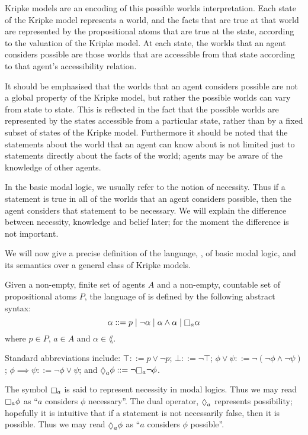 Kripke models are an encoding of this possible worlds interpretation. Each state
of the Kripke model represents a world, and the facts that are true at that
world are represented by the propositional atoms that are true at the state,
according to the valuation of the Kripke model. At each state, the worlds that
an agent considers possible are those worlds that are accessible from that state
according to that agent's accessibility relation.

It should be emphasised that the worlds that an agent considers possible are not
a global property of the Kripke model, but rather the possible worlds can vary
from state to state. This is reflected in the fact that the possible worlds are
represented by the states accessible from a particular state, rather than by a
fixed subset of states of the Kripke model. Furthermore it should be noted that
the statements about the world that an agent can know about is not limited just
to statements directly about the facts of the world; agents may be aware of the
knowledge of other agents.

In the basic modal logic, we usually refer to the notion of necessity. Thus if a
statement is true in all of the worlds that an agent considers possible, then
the agent considers that statement to be necessary. We will explain the
difference between necessity, knowledge and belief later; for the moment the
difference is not important.

We will now give a precise definition of the language, \lang{}, of basic modal
logic, and its semantics over a general class of Kripke models.

\begin{definition}
Given a non-empty, finite set of agents $A$ and a non-empty, countable set of
propositional atoms $P$, the language of \lang{} is defined by the following
abstract syntax:
$$
\alpha ::=  p \bnfalt
            \neg \alpha \bnfalt
            \alpha \land \alpha \bnfalt
            \knows_a \alpha
$$
where $p \in P$, $a \in A$ and $\alpha \in \lang{}$.
\end{definition}

Standard abbreviations include:
$\top ::= p \lor \neg p$;
$\bot ::= \neg \top$;
$\phi \lor \psi ::= \neg (\neg \phi \land \neg \psi)$;
$\phi \implies \psi ::= \neg \phi \lor \psi$;
and $\suspects_a \phi ::= \neg \knows_a \neg \phi$.

The symbol $\knows_a$ is said to represent necessity in modal logics. Thus we
may read $\knows_a \phi$ as ``$a$ considers $\phi$ necessary''. The dual
operator, $\suspects_a$ represents possibility; hopefully it is intuitive that
if a statement is not necessarily false, then it is possible. Thus we may read
$\suspects_a \phi$ as ``$a$ considers $\phi$ possible''.

